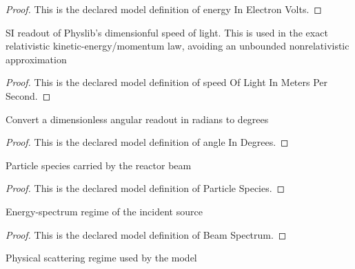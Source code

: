 \begin{proof}
  This is the declared model definition of energy In Electron Volts.
\end{proof}
\begin{definition}
  \label{def:physics:phyx-mini-0557:phyxminiproblems-problemphyxmini0557-speedoflightinmeterspersecond}
  SI readout of Physlib's dimensionful speed of light. This is used in the exact relativistic kinetic-energy/momentum law, avoiding an unbounded nonrelativistic approximation
\end{definition}
\begin{proof}
  This is the declared model definition of speed Of Light In Meters Per Second.
\end{proof}
\begin{definition}
  \label{def:physics:phyx-mini-0557:phyxminiproblems-problemphyxmini0557-angleindegrees}
  Convert a dimensionless angular readout in radians to degrees
\end{definition}
\begin{proof}
  This is the declared model definition of angle In Degrees.
\end{proof}
\begin{definition}
  \label{def:physics:phyx-mini-0557:phyxminiproblems-problemphyxmini0557-particlespecies}
  Particle species carried by the reactor beam
\end{definition}
\begin{proof}
  This is the declared model definition of Particle Species.
\end{proof}
\begin{definition}
  \label{def:physics:phyx-mini-0557:phyxminiproblems-problemphyxmini0557-beamspectrum}
  Energy-spectrum regime of the incident source
\end{definition}
\begin{proof}
  This is the declared model definition of Beam Spectrum.
\end{proof}
\begin{definition}
  \label{def:physics:phyx-mini-0557:phyxminiproblems-problemphyxmini0557-scatteringregime}
  Physical scattering regime used by the model
\end{definition}
